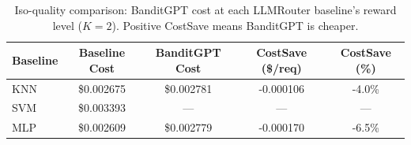 \begin{table}[htbp]
\centering
\caption{Iso-quality comparison: BanditGPT cost at each LLMRouter baseline's reward level ($K{=}2$). Positive CostSave means BanditGPT is cheaper.}
\label{tab:isoquality_k2}
\small
\begin{tabular}{lcccc}
\toprule
Baseline & Baseline Cost & BanditGPT Cost & CostSave (\$/req) & CostSave (\%) \\
\midrule
KNN & \$0.002675 & \$0.002781 & -0.000106 & -4.0\% \\
SVM & \$0.003393 & --- & --- & --- \\
MLP & \$0.002609 & \$0.002779 & -0.000170 & -6.5\% \\
\bottomrule
\end{tabular}
\end{table}
